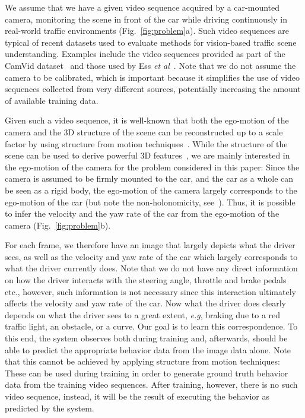 \documentclass{bmvc2k}
\def\eg{\emph{e.g}\bmvaOneDot}
\def\etal{\emph{et al}\bmvaOneDot}
\begin{document}
We assume that we have a given video sequence acquired by a car-mounted camera, monitoring the scene in front of the car while driving continuously in real-world traffic environments (Fig.~\ref{fig:problem}a). Such video sequences are typical of recent datasets used to evaluate methods for vision-based traffic scene understanding. Examples include the video sequences provided as part of the CamVid dataset~\cite{brostow09} and those used by Ess \etal~\cite{ess09}. Note that we do not assume the camera to be calibrated, which is important because it simplifies the use of video sequences collected from very different sources, potentially increasing the amount of available training data. 

Given such a video sequence, it is well-known that both the ego-motion of the camera and the 3D structure of the scene can be reconstructed up to a scale factor by using structure from motion techniques~\cite{hartley03}. While the structure of the scene can be used to derive powerful 3D features~\cite{brostow08}, we are mainly interested in the ego-motion of the camera for the problem considered in this paper: Since the camera is assumed to be firmly mounted to the car, and the car as a whole can be seen as a rigid body, the ego-motion of the camera largely corresponds to the ego-motion of the car (but note the non-holonomicity, see~\cite{scaramuzza09}). Thus, it is possible to infer the velocity and the yaw rate of the car from the ego-motion of the camera (Fig.~\ref{fig:problem}b). 

For each frame, we therefore have an image that largely depicts what the driver sees, as well as the velocity and yaw rate of the car which largely corresponds to what the driver currently does. Note that we do not have any direct information on how the driver interacts with the steering angle, throttle and brake pedals etc., however, such information is not necessary since this interaction ultimately affects the velocity and yaw rate of the car. Now what the driver does clearly depends on what the driver sees to a great extent, \eg, braking due to a red traffic light, an obstacle, or a curve. Our goal is to learn this correspondence. To this end, the system observes both during training and, afterwards, should be able to predict the appropriate behavior data from the image data alone. Note that this cannot be achieved by applying structure from motion techniques: These can be used during training in order to generate ground truth behavior data from the training video sequences. After training, however, there is no such video sequence, instead, it will be the result of executing the behavior as predicted by the system.
\end{document}
